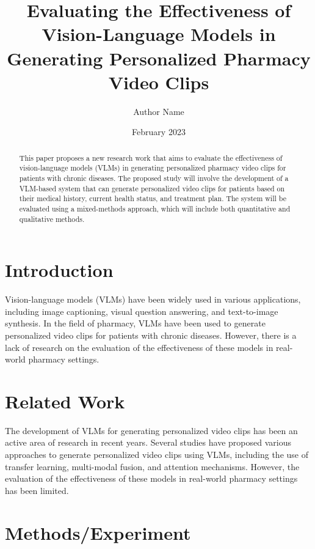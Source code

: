 \documentclass[12pt]{article}
\begin{document}
\title{Evaluating the Effectiveness of Vision-Language Models in Generating Personalized Pharmacy Video Clips}

\author{Author Name}


\date{February 2023}

\maketitle

\begin{abstract}
This paper proposes a new research work that aims to evaluate the effectiveness of vision-language models (VLMs) in generating personalized pharmacy video clips for patients with chronic diseases. The proposed study will involve the development of a VLM-based system that can generate personalized video clips for patients based on their medical history, current health status, and treatment plan. The system will be evaluated using a mixed-methods approach, which will include both quantitative and qualitative methods.
\end{abstract}

\section{Introduction}

Vision-language models (VLMs) have been widely used in various applications, including image captioning, visual question answering, and text-to-image synthesis. In the field of pharmacy, VLMs have been used to generate personalized video clips for patients with chronic diseases. However, there is a lack of research on the evaluation of the effectiveness of these models in real-world pharmacy settings.

\section{Related Work}

The development of VLMs for generating personalized video clips has been an active area of research in recent years. Several studies have proposed various approaches to generate personalized video clips using VLMs, including the use of transfer learning, multi-modal fusion, and attention mechanisms. However, the evaluation of the effectiveness of these models in real-world pharmacy settings has been limited.

\section{Methods/Experiment}
\end{document}
